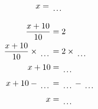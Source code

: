 \documentclass[12pt]{article}
\newcounter{minipagecount}
\begin{document}
\begin{multicols}{2}
\begin{minipage}[t]{0.45\textwidth}
\begin{align*}
        x &= \dotuline{\hspace{5mm}}\\
    \end{align*}
\end{minipage} %
\noindent{(\theminipagecount)}\hspace{0.1mm} %
\begin{minipage}[t]{0.45\textwidth} %
    \vspace{-26pt}  %
    \raggedright %
    \begin{align*} %
        \frac{x + 10}{10} &= 2\\
        \frac{x + 10}{10} \times\dotuline{\hspace{5mm}} &= 2 \times\dotuline{\hspace{5mm}}\\
        x + 10 &= \dotuline{\hspace{5mm}}\\
        x + 10 - \dotuline{\hspace{5mm}} &= \dotuline{\hspace{5mm}} - \dotuline{\hspace{5mm}}\\
        x &= \dotuline{\hspace{5mm}}\\
    \end{align*}
\end{minipage} %
\noindent{(\theminipagecount)}\hspace{0.1mm} %
\begin{minipage}[t]{0.45\textwidth} %
    \vspace{-26pt}  %

\end{minipage}
\end{multicols}
\end{document}
